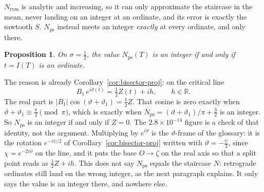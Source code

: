 \documentclass[11pt]{article}
\newtheorem{proposition}[theorem]{Proposition}
\theoremstyle{definition}
\begin{document}
$N_{\mathrm{rvm}}$ is analytic and increasing, so it can only approximate the
staircase in the mean, never landing on an integer at an ordinate, and its
error is exactly the sawtooth $S$.
$N_{\mathrm{ps}}$ instead meets an integer \emph{exactly} at every ordinate,
and only there.

\begin{proposition}\label{prop:N-ps-integer}
On $\sigma=\tfrac12$, the value $N_{\mathrm{ps}}(T)$ is an integer if and only
if $t=I(T)$ is an ordinate.
\end{proposition}

The reason is already Corollary~\ref{cor:bisector-proj}: on the critical line
\begin{equation}\label{eq:B1-rotated}
B_1\,e^{i\vartheta(t)}=\tfrac12 Z(t)+ih,\qquad h\in\mathbb R.
\end{equation}
The real part is
$\lvert B_1\rvert\cos(\vartheta+\vartheta_1)=\tfrac12 Z$.
That cosine is zero exactly when
$\vartheta+\vartheta_1\equiv\tfrac\pi2\pmod\pi$, which is exactly when
$N_{\mathrm{ps}}=(\vartheta+\vartheta_1)/\pi+\tfrac32$ is an integer.
So $N_{\mathrm{ps}}$ is an integer if and only if $Z=0$.
The $2.8\times10^{-14}$ figure is a check of that identity, not the
argument.
Multiplying by $e^{i\vartheta}$ is the $\vartheta$-frame of the glossary:
it is the rotation $e^{-i\psi/2}$ of Corollary~\ref{cor:bisector-proj}
written with $\vartheta=-\tfrac{\psi}{2}$, since $\chi=e^{-2i\vartheta}$
on the line, and it puts the base $O\to\zeta$ on the real axis so that a
split point reads as $\tfrac12 Z+ih$.
This does not say $N_{\mathrm{ps}}$ equals the staircase $N$: retrograde
ordinates still land on the wrong integer, as the next paragraph
explains. It only says the value is an integer there, and nowhere else.
\end{document}
